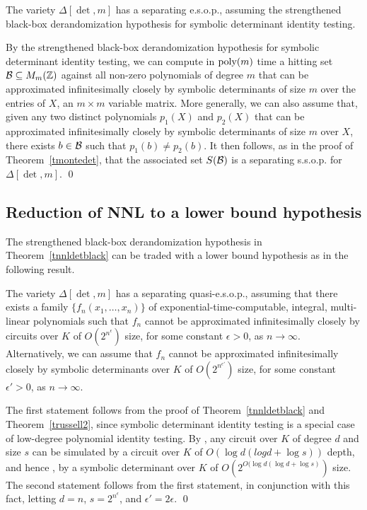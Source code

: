 \documentclass[11pt]{article}
\begin{document}
\begin{theorem} \label{tnnldetblack}
The variety $\Delta[\det,m]$ has a separating  e.s.o.p.,
assuming the strengthened black-box derandomization hypothesis for symbolic determinant identity testing.
\end{theorem}
\proof 
By the strengthened black-box derandomization hypothesis for symbolic determinant identity testing, we can compute in ${\mbox {poly}}(m)$ time a hitting set 
${\cal B} \subseteq M_m(\mathbb{Z})$  against all non-zero polynomials of degree $m$ that can be approximated infinitesimally closely by
symbolic determinants of size $m$ over the entries of $X$, an $m\times m$ variable matrix. More generally, we can also assume that,
given any two distinct polynomials $p_1(X)$ and $p_2(X)$ that can be approximated infinitesimally closely by
symbolic determinants of size $m$ over  $X$, there exists $b\in {\cal B}$ such that $p_1(b) \not = p_2(b)$.
It then follows, as in the proof of Theorem~\ref{tmontedet}, that the associated set 
$S({\cal B})$ is  a  separating  s.s.o.p. for $\Delta[\det,m]$.
\qed 

\subsection{Reduction of  NNL  to a  lower bound hypothesis} \label{snnldetquasi}
The strengthened black-box derandomization hypothesis in Theorem~\ref{tnnldetblack} can  be traded with a lower bound
hypothesis  as in the following result.

\begin{theorem} \label{tnnldetlower0}
The variety  $\Delta[\det,m]$ has a  separating quasi-e.s.o.p., assuming
that there exists a family $\{f_n(x_1,\ldots,x_n)\}$ of
exponential-time-computable, integral, multi-linear polynomials such that $f_n$
cannot be approximated infinitesimally closely by  circuits 
over $K$ of  $O(2^{n^\epsilon})$ size, for some constant $\epsilon >0$, as $n\rightarrow \infty$.
Alternatively, we can assume that $f_n$ 
cannot be approximated infinitesimally closely by symbolic determinants 
over $K$ of  $O(2^{n^{\epsilon'}})$ size, for some constant $\epsilon' >0$, as $n\rightarrow \infty$.
\end{theorem}

\proof The first statement   follows  from the proof of
Theorem~\ref{tnnldetblack} and Theorem~\ref{trussell2},
since symbolic determinant identity testing is a special case 
of low-degree polynomial identity testing. By \cite{skyum}, any 
circuit over $K$ of degree $d$ and size $s$ can be simulated by a circuit over $K$
of  $O(\log d (log d + \log s))$ depth, and hence \cite{valiant2}, by a 
symbolic determinant over $K$  of  $O(2^{O(\log d (\log d + \log s)})$ size. 
The second statement follows from the first statement, in conjunction with this fact,
letting $d=n$, $s=2^{n^\epsilon}$, and $\epsilon'=2 \epsilon$. 
\qed 
\end{document}
